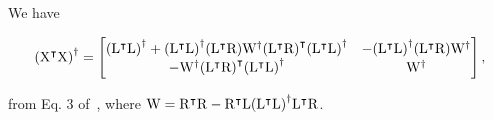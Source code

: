 \documentclass[twocolumn,draft]{article}
\begin{document}
	We have

	\begin{strip}
			\begin{equation*}
						{({\mathrm{X}}^\intercal\mathrm{X})}^{\dagger} =
								\begin{bmatrix}
												{({\mathrm{L}}^\intercal\mathrm{L})}^{\dagger} + {({\mathrm{L}}^\intercal\mathrm{L})}^{\dagger} ({\mathrm{L}}^\intercal\mathrm{R})
																{\mathrm{W}}^{\dagger} {({\mathrm{L}}^\intercal\mathrm{R})}^\intercal {({\mathrm{L}}^\intercal\mathrm{L})}^{\dagger}
																				& - {({\mathrm{L}}^\intercal\mathrm{L})}^{\dagger} ({\mathrm{L}}^\intercal\mathrm{R})
																								{\mathrm{W}}^{\dagger} \\
																											- {\mathrm{W}}^{\dagger} {({\mathrm{L}}^\intercal\mathrm{R})}^\intercal
																														{({\mathrm{L}}^\intercal\mathrm{L})}^{\dagger} & {\mathrm{W}}^{\dagger}
																																\end{bmatrix},
																																	\end{equation*}
	\end{strip}
	from Eq. 3 of~\cite{rohde1965generalized}, where
	$\mathrm{W} = {\mathrm{R}}^\intercal\mathrm{R} - {\mathrm{R}}^\intercal\mathrm{L}{({\mathrm{L}}^\intercal\mathrm{L})}^{\dagger}
	{\mathrm{L}}^\intercal\mathrm{R}$.
\end{document}
